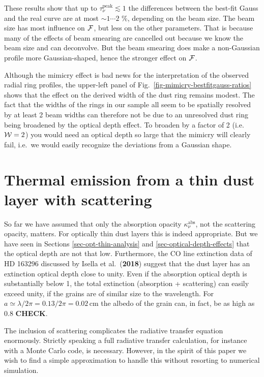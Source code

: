 \documentclass{aa}
\def\paperdsharpisella{Isella et al.\ ({\bf 2018})}
\begin{document}
These results show that up to $\tau_\nu^{\mathrm{peak}}\lesssim 1$ the
differences between the best-fit Gauss and the real curve are at most $\sim
1\cdots 2$ \%, depending on the beam size. The beam size has most influence
on ${\cal F}$, but less on the other parameters. That is because many of the
effects of beam smearing are cancelled out because we know the beam size and
can deconvolve. But the beam smearing does make a non-Gaussian profile more
Gaussian-shaped, hence the stronger effect on ${\cal F}$. 

Although the mimicry effect is bad news for the interpretation of the observed
radial ring profiles, the upper-left panel of
Fig.~\ref{fig-mimicry-bestfitgauss-ratios} shows that the effect on the derived
width of the dust ring remains modest. The fact that the widths of the rings in
our sample all seem to be spatially resolved by at least 2 beam widths can
therefore not be due to an unresolved dust ring being broadened by the optical
depth effect. To broaden by a factor of 2 (i.e.~${\cal W}=2$) you would need
an optical depth so large that the mimicry will clearly fail, i.e.\ we would
easily recognize the deviations from a Gaussian shape.



\section{Thermal emission from a thin dust layer with scattering}
\label{sec-oned-radtrans-model}
%
So far we have assumed that only the absorption opacity
$\kappa_\nu^{\mathrm{abs}}$, not the scattering opacity, matters. For optically
thin dust layers this is indeed appropriate. But we have seen in Sections
\ref{sec-opt-thin-analysis} and \ref{sec-optical-depth-effects} that the
optical depth are not that low. Furthermore, the CO line extinction data
of HD 163296 discussed by \paperdsharpisella{} suggest that the dust
layer has an extinction optical depth close to unity. Even if the absorption
optical depth is substantially below 1, the total extinction (absorption +
scattering) can easily exceed unity, if the grains are of similar size to
the wavelength. For $a\simeq \lambda/2\pi=0.13/2\pi = 0.02\,\mathrm{cm}$ the
albedo of the grain can, in fact, be as high as 0.8 {\bf CHECK}.

The inclusion of scattering complicates the radiative transfer equation
enormously. Strictly speaking a full radiative transfer calculation, for
instance with a Monte Carlo code, is necessary. However, in the spirit of
this paper we wish to find a simple approximation to handle this without
resorting to numerical simulation.
\end{document}
